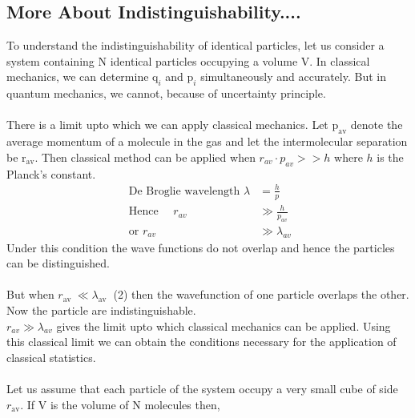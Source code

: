  \subsection{More About Indistinguishability....}
 To understand the indistinguishability of identical particles, let us consider a system containing $\mathrm{N}$ identical particles occupying a volume V. In classical mechanics, we can determine $\mathrm{q}_{i}$ and $\mathrm{p}_{i}$ simultaneously and accurately. But in quantum mechanics, we cannot, because of uncertainty principle.\\\\
 There is a limit upto which we can apply classical mechanics. Let $\mathrm{p}_{\mathrm{av}}$ denote the average momentum of a molecule in the gas and let the intermolecular separation be $\mathrm{r}_{\mathrm{av}}$. Then classical method can be applied when $r_{a v} \cdot p_{a v}>>h$ where $h$ is the Planck's constant.
 \begin{align*}
 \text { De Broglie wavelength } \lambda&=\frac{h}{p}\\
 \text { Hence } \quad r_{a v} &\gg \frac{h}{p_{a v}}\\
 \text { or } r_{a v} &\gg \lambda_{a v}
 \end{align*}
 Under this condition the wave functions do not overlap and hence the particles can be distinguished.\\\\
 But when $r_{\text {av }} \ll \lambda_{\text {av }}$
 (2) then the wavefunction of one particle overlaps the other. Now the particle are indistinguishable.\\
 $r_{a v} \gg \lambda_{a v}$ gives the limit upto which classical mechanics can be applied. Using this classical limit we can obtain the conditions necessary for the application of classical statistics.\\\\
 Let us assume that each particle of the system occupy a very small cube of side $r_{\mathrm{av}}$. If $\mathrm{V}$ is the volume of $\mathrm{N}$ molecules then,
